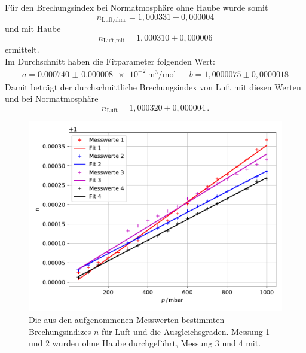 \noindent Für den Brechungsindex bei Normatmosphäre ohne Haube wurde somit 
\begin{equation*}
  n_\text{Luft,ohne} = 1,000331 \pm 0,000004
\end{equation*}
und mit Haube 
\begin{equation*}
  n_\text{Luft,mit} = 1,000310 \pm 0,000006
\end{equation*}
ermittelt.\\
Im Durchschnitt haben die Fitparameter folgenden Wert:
\begin{align*}
  a = \SI{0.000740(8)e-2}{\cubic\metre\per\mole}& &b = 1,0000075 \pm 0,0000018
\end{align*}
Damit beträgt der durchschnittliche Brechungsindex von Luft mit diesen Werten und bei Normatmosphäre 
\begin{equation*}
  n_{\text{Luft}} = 1,000320 \pm 0,000004 \, .
\end{equation*}

\begin{figure}[H]
  \centering
  \includegraphics[width=\textwidth]{build/lorentz_lorenz.pdf}
  \caption{Die aus den aufgenommenen Messwerten bestimmten Brechungsindizes $n$ für Luft und die Ausgleichsgraden.
  Messung 1 und 2 wurden ohne Haube durchgeführt, Messung 3 und 4 mit.}
  \label{fig:lorentz_lorenz}
\end{figure}